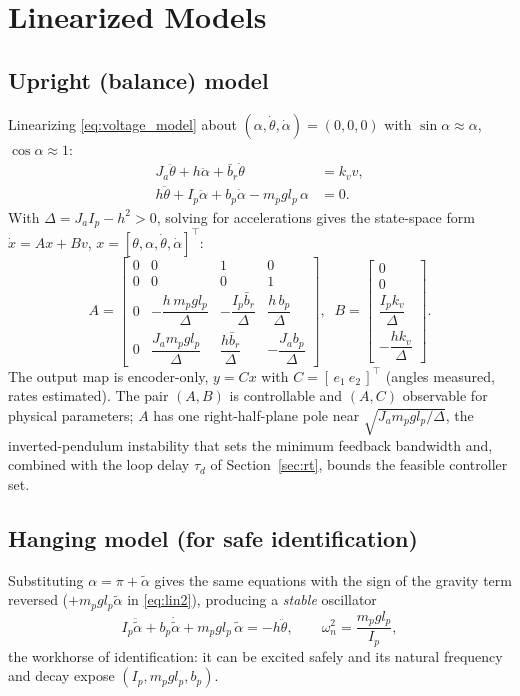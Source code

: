 \documentclass[conference]{IEEEtran}
\begin{document}
\section{Linearized Models}\label{sec:lin}

\subsection{Upright (balance) model}
Linearizing \eqref{eq:voltage_model} about $(\alpha,\dot\theta,\dot\alpha)=(0,0,0)$ with $\sin\alpha\!\approx\!\alpha$, $\cos\alpha\!\approx\!1$:
\begin{align}
J_a\ddot\theta + h\ddot\alpha + \bar b_r\dot\theta &= k_v v, \label{eq:lin1}\\
h\ddot\theta + I_p\ddot\alpha + b_p\dot\alpha - m_p g l_p\,\alpha &= 0. \label{eq:lin2}
\end{align}
With $\Delta = J_a I_p - h^2 > 0$, solving for accelerations gives the state-space form $\dot x = A x + B v$, $x=[\theta,\alpha,\dot\theta,\dot\alpha]^{\!\top}$:
\begin{equation}
A = \begin{bmatrix}
0&0&1&0\\ 0&0&0&1\\
0& -\dfrac{h\,m_p g l_p}{\Delta} & -\dfrac{I_p\bar b_r}{\Delta} & \dfrac{h\,b_p}{\Delta}\\[4pt]
0& \dfrac{J_a m_p g l_p}{\Delta} & \dfrac{h\bar b_r}{\Delta} & -\dfrac{J_a b_p}{\Delta}
\end{bmatrix},\;\;
B = \begin{bmatrix} 0\\0\\ \dfrac{I_p k_v}{\Delta}\\[3pt] -\dfrac{h k_v}{\Delta}\end{bmatrix}.
\label{eq:AB}
\end{equation}
The output map is encoder-only, $y = Cx$ with $C = [\,e_1\ e_2\,]^{\!\top}$ (angles measured, rates estimated). The pair $(A,B)$ is controllable and $(A,C)$ observable for physical parameters; $A$ has one right-half-plane pole near $\sqrt{J_a m_p g l_p/\Delta}$, the inverted-pendulum instability that sets the minimum feedback bandwidth and, combined with the loop delay $\tau_d$ of Section~\ref{sec:rt}, bounds the feasible controller set.

\subsection{Hanging model (for safe identification)}
Substituting $\alpha = \pi + \tilde\alpha$ gives the same equations with the sign of the gravity term reversed ($+m_p g l_p\tilde\alpha$ in \eqref{eq:lin2}), producing a \emph{stable} oscillator
\begin{equation}
I_p\ddot{\tilde\alpha} + b_p\dot{\tilde\alpha} + m_p g l_p\,\tilde\alpha = -h\ddot\theta,
\qquad
\omega_n^2 = \frac{m_p g l_p}{I_p},
\label{eq:hanging}
\end{equation}
the workhorse of identification: it can be excited safely and its natural frequency and decay expose $(I_p, m_p g l_p, b_p)$.
\end{document}
